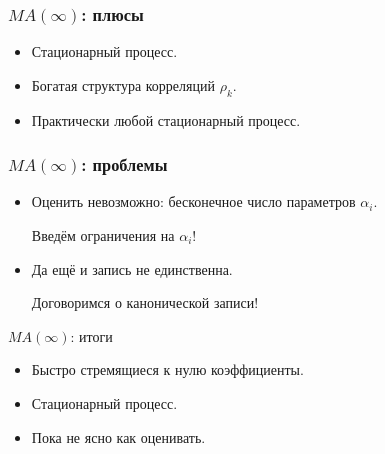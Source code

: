 \begin{frame}
  \frametitle{$MA(\infty)$: плюсы}

  \begin{itemize}[<+->]
    \item \alert{Стационарный} процесс.
    \item Богатая структура корреляций $\rho_k$.
    \item \alert{Практически} любой стационарный процесс. 
  \end{itemize}

\end{frame}


\begin{frame}
    \frametitle{$MA(\infty)$: проблемы}

    \begin{itemize}[<+->]
        \item Оценить невозможно: \alert{бесконечное} число параметров $\alpha_i$. 
        
        \pause
        Введём \alert{ограничения} на $\alpha_i$!

        \item Да ещё и запись \alert{не единственна}.
        
        \pause
        Договоримся о \alert{канонической} записи!
    \end{itemize}

\end{frame}


\begin{frame}{$MA(\infty)$: итоги}

  \begin{itemize}[<+->]
    \item \alert{Быстро} стремящиеся к нулю коэффициенты. 
    \item \alert{Стационарный процесс}. 
    \item \alert{Пока} не ясно как оценивать.
  \end{itemize}
\end{frame}

